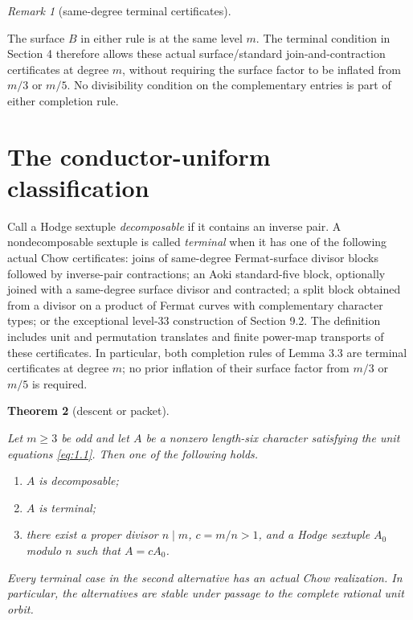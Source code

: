 \documentclass[11pt]{amsart}
\newtheorem{theorem}{Theorem}
\numberwithin{theorem}{section}
\theoremstyle{remark}
\newtheorem{remark}[theorem]{Remark}
\numberwithin{equation}{section}
\providecommand{\tightlist}{\setlength{\itemsep}{0pt}\setlength{\parskip}{0pt}}
\begin{document}
\begin{remark}[same-degree terminal certificates]\label{remark:3.4}

The surface \(B\) in either rule is at the same level \(m\). The terminal
condition in Section 4 therefore allows these actual surface/standard
join-and-contraction certificates at degree \(m\), without requiring the
surface factor to be inflated from \(m/3\) or \(m/5\). No divisibility
condition on the complementary entries is part of either completion rule.
\end{remark}

\section{The conductor-uniform classification}\label{sec:4}

Call a Hodge sextuple \emph{decomposable} if it contains an inverse pair.
A nondecomposable sextuple is called \emph{terminal} when it has one of the
following actual Chow certificates: joins of same-degree Fermat-surface
divisor blocks followed by inverse-pair contractions; an Aoki
standard-five block, optionally joined with a same-degree surface divisor
and contracted; a split block obtained from a divisor on a product of
Fermat curves with complementary character types; or the exceptional
level-33 construction of Section 9.2. The definition includes unit and
permutation translates and finite power-map transports of these
certificates. In particular, both completion rules of Lemma 3.3 are
terminal certificates at degree \(m\); no prior inflation of their
surface factor from \(m/3\) or \(m/5\) is required.

\begin{theorem}[descent or packet]\label{theorem:4.1}

Let \(m\ge3\) be odd and let \(A\) be a nonzero length-six character satisfying
the unit equations \eqref{eq:1.1}. Then one of the following holds.

\begin{enumerate}[label=\arabic*.,leftmargin=*]\tightlist
\item \(A\) is decomposable;
\item \(A\) is terminal;
\item there exist a proper divisor \(n\mid m\), \(c=m/n>1\), and a Hodge sextuple
\(A_0\) modulo \(n\) such that \(A=cA_0\).
\end{enumerate}

Every terminal case in the second alternative has an actual Chow realization. In particular, the
alternatives are stable under passage to the complete rational unit orbit.
\end{theorem}
\end{document}
